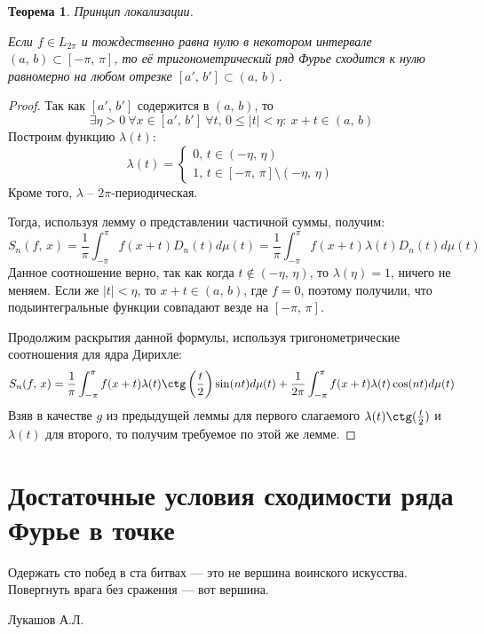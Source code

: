 \documentclass[a4paper,12pt]{article}
\renewcommand{\leq}{\ensuremath{\leqslant}}
\theoremstyle{plain}
\newtheorem{theorem}{Теорема}[section]
\theoremstyle{definition}
\theoremstyle{remark}
\begin{document}
\begin{theorem}
	Принцип локализации.

	Если $f \in L_{2\pi}$ и тождественно равна нулю в некотором интервале $(a,\,b) \subset [-\pi,\,\pi]$, то её тригонометрический ряд Фурье сходится к нулю равномерно на любом отрезке $[a',\,b'] \subset (a,\,b)$.
\end{theorem}

\begin{proof}
	Так как $[a',\,b']$ содержится в $(a,\,b)$, то
	\[\exists \eta > 0 \: \forall x \in [a',\,b'] \: \forall t,\, 0 \leq |t| < \eta :\: x + t \in (a,\,b)\]
	Построим функцию $\lambda(t)$:
	\[
		\lambda(t) = \begin{cases}
			0,\, t \in (-\eta,\,\eta) \\
			1,\, t \in [-\pi,\,\pi]\setminus (-\eta,\,\eta)
		\end{cases}
	\]
	Кроме того, $\lambda$ -- $2\pi$-периодическая.

	Тогда, используя лемму о представлении частичной суммы, получим:
	\[
		S_n(f,\,x) = \frac{1}{\pi}\int_{-\pi}^\pi f(x + t)D_n(t)d\mu(t) = \frac{1}{\pi}\int_{-\pi}^\pi f(x + t)\lambda(t)D_n(t)d\mu(t)
	\]
	Данное соотношение верно, так как когда $t \not\in (-\eta,\,\eta)$, то $\lambda(\eta) = 1$, ничего не меняем. Если же $|t| < \eta$, то $x + t \in (a,\,b)$, где $f = 0$, поэтому получили, что подыинтегральные функции совпадают везде на $[-\pi,\,\pi]$.

	Продолжим раскрытия данной формулы, используя тригонометрические соотношения для ядра Дирихле:
	\begin{align*}
		S_n(f,\,x) = \frac{1}{\pi}\int_{-\pi}^\pi f(x + t)\lambda(t)\ctg\left(\frac{t}{2}\right)\sin(nt)d\mu(t) + \frac{1}{2\pi}\int_{-\pi}^\pi f(x+t)\lambda(t)\cos(nt)d\mu(t)
	\end{align*}
	Взяв в качестве $g$ из предыдущей леммы для первого слагаемого $\lambda(t)\ctg(\frac{t}{2})$ и $\lambda(t)$ для второго, то получим требуемое по этой же лемме.

\end{proof}

\section{Достаточные условия сходимости ряда Фурье в точке}

\epigraph{Одержать сто побед в ста битвах — это не вершина воинского искусства. Повергнуть врага без сражения — вот вершина.}{Лукашов А.Л.}
\end{document}
